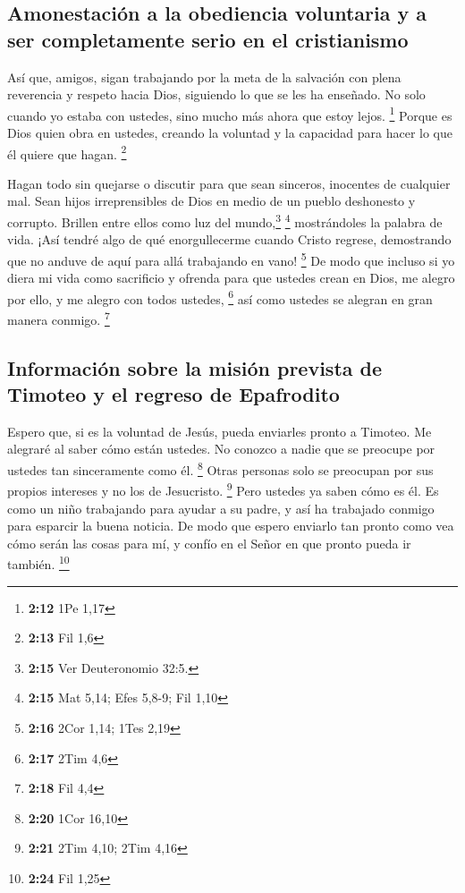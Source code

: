 \hypertarget{amonestaciuxf3n-a-la-obediencia-voluntaria-y-a-ser-completamente-serio-en-el-cristianismo}{%
\subsection{Amonestación a la obediencia voluntaria y a ser
completamente serio en el
cristianismo}\label{amonestaciuxf3n-a-la-obediencia-voluntaria-y-a-ser-completamente-serio-en-el-cristianismo}}

 Así que, amigos, sigan trabajando por la meta de la
salvación con plena reverencia y respeto hacia Dios, siguiendo lo que se
les ha enseñado. No solo cuando yo estaba con ustedes, sino mucho más
ahora que estoy lejos. \footnote{\textbf{2:12} 1Pe 1,17} 
Porque es Dios quien obra en ustedes, creando la voluntad y la capacidad
para hacer lo que él quiere que hagan. \footnote{\textbf{2:13} Fil 1,6}

 Hagan todo sin quejarse o discutir  para
que sean sinceros, inocentes de cualquier mal. Sean hijos irreprensibles
de Dios en medio de un pueblo deshonesto y corrupto. Brillen entre ellos
como luz del mundo,\footnote{\textbf{2:15} Ver Deuteronomio 32:5.}
\footnote{\textbf{2:15} Mat 5,14; Efes 5,8-9; Fil 1,10} 
mostrándoles la palabra de vida. ¡Así tendré algo de qué enorgullecerme
cuando Cristo regrese, demostrando que no anduve de aquí para allá
trabajando en vano! \footnote{\textbf{2:16} 2Cor 1,14; 1Tes 2,19}
 De modo que incluso si yo diera mi vida como sacrificio
y ofrenda para que ustedes crean en Dios, me alegro por ello, y me
alegro con todos ustedes, \footnote{\textbf{2:17} 2Tim 4,6}
 así como ustedes se alegran en gran manera conmigo.
\footnote{\textbf{2:18} Fil 4,4}

\hypertarget{informaciuxf3n-sobre-la-misiuxf3n-prevista-de-timoteo-y-el-regreso-de-epafrodito}{%
\subsection{Información sobre la misión prevista de Timoteo y el regreso
de
Epafrodito}\label{informaciuxf3n-sobre-la-misiuxf3n-prevista-de-timoteo-y-el-regreso-de-epafrodito}}

 Espero que, si es la voluntad de Jesús, pueda enviarles
pronto a Timoteo. Me alegraré al saber cómo están ustedes.
 No conozco a nadie que se preocupe por ustedes tan
sinceramente como él. \footnote{\textbf{2:20} 1Cor 16,10}
 Otras personas solo se preocupan por sus propios
intereses y no los de Jesucristo. \footnote{\textbf{2:21} 2Tim 4,10;
  2Tim 4,16}  Pero ustedes ya saben cómo es él. Es como
un niño trabajando para ayudar a su padre, y así ha trabajado conmigo
para esparcir la buena noticia.  De modo que espero
enviarlo tan pronto como vea cómo serán las cosas para mí,
 y confío en el Señor en que pronto pueda ir también.
\footnote{\textbf{2:24} Fil 1,25}

